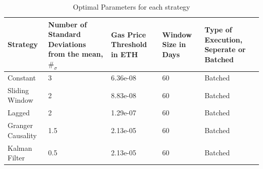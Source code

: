 \begin{table}[H]
    \centering
    \begin{tabular}{|p{6em}|p{8em}|p{6em}|p{4em}|p{8em}|}
    \hline
        Strategy & Number of Standard Deviations from the mean, $\#_{\sigma}$ & Gas Price Threshold in ETH & Window Size in Days & Type of Execution, Seperate or Batched \\ \hline
        Constant & 3 & 6.36e-08 & 60 & Batched \\ \hline
        Sliding Window & 2 & 8.83e-08 & 60 & Batched \\ \hline
        Lagged & 2 & 1.29e-07 & 60 & Batched \\ \hline
        Granger Causality & 1.5 & 2.13e-05 & 60 & Batched \\ \hline
        Kalman Filter & 0.5 & 2.13e-05 & 60 & Batched \\ \hline
    \end{tabular}
    \caption{Optimal Parameters for each strategy \label{tab:OptimParams}}
\end{table}

